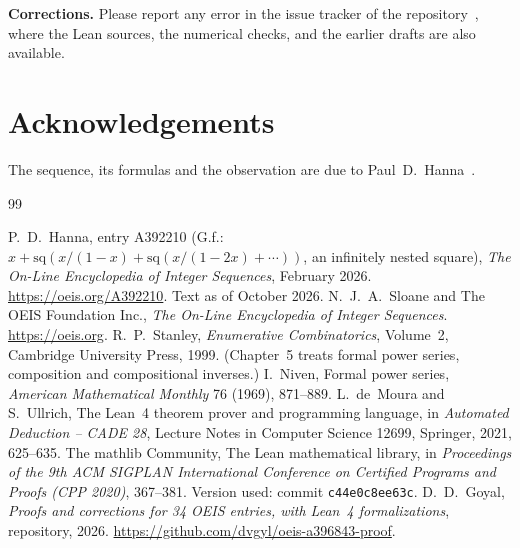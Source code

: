 \documentclass[11pt,a4paper]{article}
\theoremstyle{definition}
\theoremstyle{remark}
\newcommand{\para}[1]{\par\medskip\noindent\textbf{#1}\enspace}
\begin{document}
\para{Corrections.} Please report any error in the issue tracker of the repository~\cite{repo}, where the Lean
sources, the numerical checks, and the earlier drafts are also available.

\section*{Acknowledgements}
The sequence, its formulas and the observation are due to Paul~D.~Hanna~\cite{oeis}.

\begin{thebibliography}{99}\small
\raggedright
{} P.~D.~Hanna, entry A392210 (G.f.: $x+\mathrm{sq}(x/(1-x)+\mathrm{sq}(x/(1-2x)+\cdots))$, an infinitely nested square), \emph{The On-Line Encyclopedia of Integer Sequences}, February 2026. \url{https://oeis.org/A392210}. Text as of October 2026.
 N.~J.~A.~Sloane and The OEIS Foundation Inc., \emph{The On-Line Encyclopedia of Integer Sequences}. \url{https://oeis.org}.
 R.~P.~Stanley, \emph{Enumerative Combinatorics}, Volume~2, Cambridge University Press, 1999. (Chapter~5 treats formal power series, composition and compositional inverses.)
 I.~Niven, Formal power series, \emph{American Mathematical Monthly} 76 (1969), 871--889.
 L.~de~Moura and S.~Ullrich, The Lean~4 theorem prover and programming language, in \emph{Automated Deduction -- CADE 28}, Lecture Notes in Computer Science 12699, Springer, 2021, 625--635.
 The mathlib Community, The Lean mathematical library, in \emph{Proceedings of the 9th ACM SIGPLAN International Conference on Certified Programs and Proofs (CPP 2020)}, 367--381. Version used: commit \texttt{c44e0c8ee63c}.
 D.~D.~Goyal, \emph{Proofs and corrections for 34 OEIS entries, with Lean~4 formalizations}, repository, 2026. \url{https://github.com/dvgyl/oeis-a396843-proof}.
\end{thebibliography}
\end{document}
